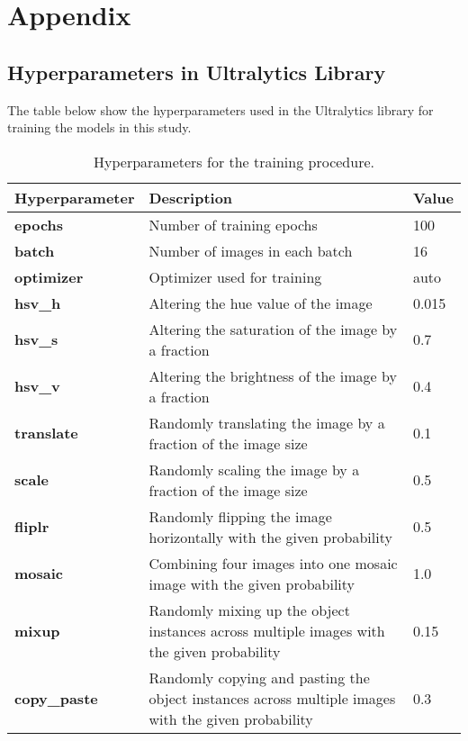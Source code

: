 \section{Appendix}
\label{sec:appendix}

\subsection{Hyperparameters in Ultralytics Library}

The table below show the hyperparameters used in the Ultralytics library for training the models in this study.

\begin{table}[H]
    \caption{Hyperparameters for the training procedure.}
    \centering
    \begin{tabular}{|l|p{}|l|}
        \hline
        \textbf{Hyperparameter} & \textbf{Description} & \textbf{Value} \\
        \hline
        \textbf{epochs} & Number of training epochs & 100 \\
        \textbf{batch} & Number of images in each batch & 16 \\
        \textbf{optimizer} & Optimizer used for training & auto \\
        \textbf{hsv\_h} & Altering the hue value of the image & 0.015 \\
        \textbf{hsv\_s} & Altering the saturation of the image by a fraction & 0.7 \\
        \textbf{hsv\_v} & Altering the brightness of the image by a fraction & 0.4 \\
        \textbf{translate} & Randomly translating the image by a fraction of the image size & 0.1 \\
        \textbf{scale} & Randomly scaling the image by a fraction of the image size & 0.5 \\
        \textbf{fliplr} & Randomly flipping the image horizontally with the given probability & 0.5 \\
        \textbf{mosaic} & Combining four images into one mosaic image with the given probability & 1.0 \\
        \textbf{mixup} & Randomly mixing up the object instances across multiple images with the given probability & 0.15 \\
        \textbf{copy\_paste} & Randomly copying and pasting the object instances across multiple images with the given probability & 0.3 \\
        \hline
    \end{tabular}
    \label{tab:hyperparameters}
\end{table}
